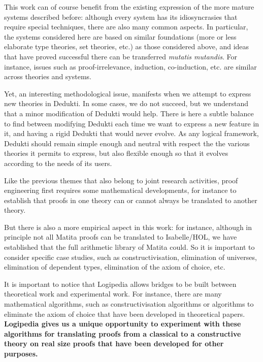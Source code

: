 This work can of course benefit from the existing expression of the
more mature systems described before: although every system has its
idiosyncrasies that require special techniques, there are also many
common aspects. In particular, the systems considered here are based
on similar foundations (more or less elaborate type theories, set
theories, etc.) as those considered above, and ideas that have proved
successful there can be transferred {\em mutatis mutandis}. For
instance, issues such as proof-irrelevance, induction, co-induction,
etc. are similar across theories and systems.

Yet, an interesting methodological issue, manifests when we attempt to
express new theories in Dedukti. In some cases, we do not succeed, but
we understand that a minor modification of Dedukti would help. There
is here a subtle balance to find between modifying Dedukti each time
we want to express a new feature in it, and having a rigid Dedukti
that would never evolve. As any logical framework, Dedukti should
remain simple enough and neutral with respect the the various theories
it permits to express, but also flexible enough so that it evolves
according to the needs of its users.


Like the previous themes that also belong to joint research activities,
proof engineering first requires some mathematical developments, for
instance to establish that proofs in one theory can or cannot always
be translated to another theory.

But there is also a more empirical aspect in this work: for instance,
although in principle not all Matita proofs can be translated to
Isabelle/HOL, we have established that the full arithmetic library of
Matita could. So it is important to consider specific case studies,
such as constructivisation, elimination of universes, elimination of
dependent types, elimination of the axiom of choice, etc.

It is important to notice that Logipedia allows bridges to be built
between theoretical work and experimental work. For instance, there
are many mathematical algorithms, such as constructivisation
algorithms or algorithms to eliminate the axiom of choice that have
been developed in theoretical papers. {\bf Logipedia gives us a unique
opportunity to experiment with these algorithms for translating proofs
from a classical to a constructive theory on real size proofs that
have been developed for other purposes.}


